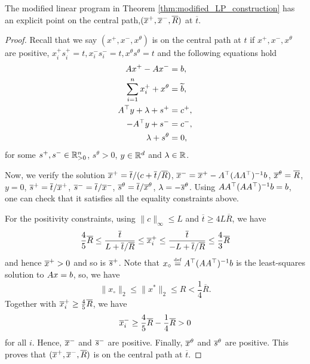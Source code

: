\begin{lem}
\label{lem:ipm_interior_modified}The modified linear program in Theorem
\ref{thm:modified_LP_construction} has an explicit point on the central
path,$(\overline{x}^{+},\overline{x}^{-},\overline{R})$ at $\overline{t}$.
\end{lem}

\begin{proof}
Recall that we say $(x^{+},x^{-},x^{\theta})$ is on the central path
at $t$ if $x^{+},x^{-},x^{\theta}$ are positive, $x^{+}_{i}s^{+}_{i}=t,x^{-}_{i}s^{-}_{i}=t,x^{\theta}s^{\theta}=t$
and the following equations hold
\begin{align}
A x^{+}-A x^{-} & =b,\nonumber \\
\sum^{n}_{i=1}x^{+}_{i}+x^{\theta} & =\widetilde{b},\nonumber \\
A^{\top}y+\lambda+s^{+} & =c^{+},\label{eq:KKT_modified_LP}\\
-A^{\top}y+s^{-} & =c^{-},\nonumber \\
\lambda+s^{\theta} & =0,\nonumber 
\end{align}
for some $s^{+},s^{-}\in\mathbb{R}^{n}_{>0}$, $s^{\theta}>0$, $y\in\mathbb{R}^{d}$
and $\lambda\in\mathbb{R}$.

Now, we verify the solution $\overline{x}^{+}=\overline{t}/(c+\overline{t}/\overline{R})$,
$\overline{x}^{-}=\overline{x}^{+}-A^{\top}(AA^{\top})^{-1}b$, $\overline{x}^{\theta}=\overline{R}$,
$y=0$, $\overline{s}^{+}=\overline{t}/\overline{x}^{+}$, $\overline{s}^{-}=\overline{t}/\overline{x}^{-}$,
$\overline{s}^{\theta}=\overline{t}/\overline{x}^{\theta}$, $\lambda=-\overline{s}^{\theta}$.
Using $AA^{\top}(AA^{\top})^{-1}b=b$, one can check that
it satisfies all the equality constraints above. 

For the positivity constraints, using $\|c\|_{\infty}\leq L$ and
$\overline{t}\geq4L\overline{R}$, we have
\begin{equation}
\frac{4}{5}\overline{R}\leq\frac{\overline{t}}{L+\overline{t}/\overline{R}}\leq\overline{x}^{+}_{i}\leq\frac{\overline{t}}{-L+\overline{t}/\overline{R}}\leq\frac{4}{3}\overline{R}\label{eq:x_pos_bound}
\end{equation}
and hence $\overline{x}^{+}>0$ and so is $\overline{s}^{+}$. Note that $x_{\circ}\stackrel{\mathrm{{\scriptscriptstyle def}}}{=}A^{\top}(AA^{\top})^{-1}b$
is the least-squares solution to $A x=b$, so, we have 
\begin{equation}
\|x_{\circ}\|_{2}\leq\|x^{*}\|_{2}\leq R<\frac{1}{4}\overline{R}.\label{eq:x0_upper_bound}
\end{equation}
Together with $\overline{x}^{+}_{i}\geq\frac{4}{5}\overline{R}$, we have
\[
\overline{x}^{-}_{i}\geq\frac{4}{5}\overline{R}-\frac{1}{4}\overline{R}>0
\]
for all $i$. Hence, $\overline{x}^{-}$ and $\overline{s}^{-}$ are positive. Finally,
$\overline{x}^{\theta}$ and $\overline{s}^{\theta}$ are positive. This proves that
$(\overline{x}^{+},\overline{x}^{-},\overline{R})$ is on the central path at $\overline{t}$.
\end{proof}
